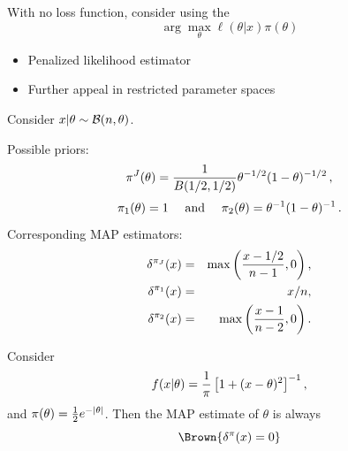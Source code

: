 \begin{slide}
\pause
{}

\end{slide}\begin{slide}

With no loss function, consider using
the {}
$$
\arg\max_\theta \ell(\theta|x)\pi(\theta)
$$

\smallskip\pause
\begin{itemize}
\item Penalized likelihood estimator
\pause
\item Further appeal in restricted parameter spaces
\end{itemize}

\end{slide}\begin{slide}
Consider $x|\theta\sim{\cal B}(n,\theta)$. 

Possible priors:
$$
\pi^J (\theta) = {1 \over B(1/2,1/2)} \theta^{-1/2} (1-\theta)^{-1/2}\,,
$$
$$
\pi_1(\theta) = 1 \quad \hbox { and } \quad \pi_ 2(\theta) = \theta^{-1}(1-\theta)^{-1} \,.
$$
\pause
Corresponding MAP estimators:
\small
\begin{eqnarray*}
\delta^{\pi_J} (x) &=& \max \left({x-1/2 \over n - 1} , 0 \right) , \\
\delta^{\pi_1} (x) &=&  x / n , \\
\delta^{\pi_2} (x) &=& \max \left({x-1 \over n-2} , 0 \right) .
\end{eqnarray*}
\normalsize
\fin

\end{slide}\begin{slide}
 Consider  
$$
f(x | \theta ) = {1 \over \pi}  \left[1+(x-\theta )^2 \right]^{-1},
$$
and $\pi(\theta)={1 \over 2} e^{-|\theta |}$.
\pause
Then the MAP estimate of $\theta$ is always
\[\Brown{
  \delta^\pi (x) = 0
}\]
\fin

\end{slide}
